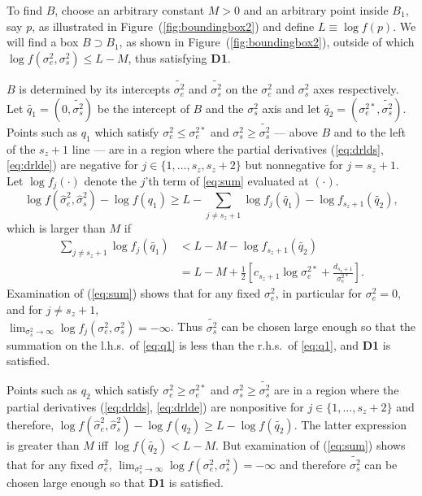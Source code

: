 \documentclass{report}
\newcommand{\RL}{f}
\newcommand{\logRL}{\log\RL}
\newcommand{\sigssq}{\sigma_s^2}
\newcommand{\sigesq}{\sigma_e^2}
\newcommand{\sshat}{\hat\sigma^2_e,\hat\sigma^2_s}
\newcommand{\logRLss}{\logRL(\sigesq,\sigssq)}
\begin{document}
To find $B$, choose an arbitrary constant $M>0$ and an arbitrary point inside $B_1$, say $p$, as illustrated in Figure~(\ref{fig:boundingbox2}) and define $L \equiv \logRL(p)$.  We will find a box $B\supset B_1$, as shown in Figure~(\ref{fig:boundingbox2}), outside of which $\logRLss \le L-M$, thus satisfying \textbf{D1}.

$B$ is determined by its intercepts $\widetilde{\sigma_e^2}$ and $\widetilde{\sigma_s^2}$ on the $\sigesq$ and $\sigssq$ axes respectively.  Let $\widetilde{q_1} = (0,\widetilde{\sigma_s^2})$ be the intercept of $B$ and the $\sigssq$ axis and let $\widetilde{q_2} = (\sigma_e^{2*},\widetilde{\sigma_s^2})$. Points such as $q_1$ which satisfy $\sigesq \le \sigma_e^{2*}$ and $\sigssq \ge \widetilde{\sigma_s^2}$ --- above $B$ and to the left of the $s_z+1$ line --- are in a region where the partial derivatives (\ref{eq:drlds}, \ref{eq:drlde}) are negative for $j \in \{1, \dots, s_z, s_z+2\}$ but nonnegative for $j=s_z+1$.  Let $\logRL_j(\cdot)$ denote the $j$'th term of \eqref{eq:sum} evaluated at $(\cdot)$.  
\begin{equation}
	\logRL(\sshat) - \logRL(q_1) \ge L - \sum_{j \ne s_z+1} \logRL_j(\widetilde{q_1}) - \logRL_{s_z+1}(\widetilde{q_2}),
\end{equation}
which is larger than $M$ if
\begin{equation}
\label{eq:q1}
  \begin{split}
    \sum_{j \ne s_z+1} \logRL_j(\widetilde{q_1})
      &< L - M - \logRL_{s_z+1}(\widetilde{q_2})\\
      &= L - M + \frac{1}{2} \left[ c_{s_z+1}\log\sigma_e^{2*} + \frac{d_{s_z+1}}{\sigma_e^{2*}}\right].
  \end{split}
\end{equation}
Examination of (\ref{eq:sum}) shows that for any fixed $\sigesq$, in particular for $\sigesq=0$, and for $j \ne s_z+1$,\\ $\lim_{\sigssq \rightarrow \infty} \logRL_j(\sigesq,\sigssq) = -\infty$.  Thus $\widetilde{\sigma_s^2}$ can be chosen large enough so that the summation on the l.h.s.~of \eqref{eq:q1} is less than the r.h.s.~of \eqref{eq:q1}, and  \textbf{D1} is satisfied.

Points such as $q_2$ which satisfy $\sigesq \ge \sigma_e^{2*}$ and $\sigssq \ge \widetilde{\sigma_s^2}$ are in a region where the partial derivatives (\ref{eq:drlds}, \ref{eq:drlde}) are nonpositive for $j \in \{1, \dots, s_z+2\}$ and therefore, $\logRL(\sshat) - \logRL(q_2) \ge L - \logRL(\widetilde{q_2})$.  The latter expression is greater than $M$ iff $\logRL(\widetilde{q_2}) < L-M$.  But examination of (\ref{eq:sum}) shows that for any fixed $\sigesq$, $\lim_{\sigssq \rightarrow \infty} \logRLss = -\infty$ and therefore $\widetilde{\sigma_s^2}$ can be chosen large enough so that \textbf{D1} is satisfied.
\end{document}
